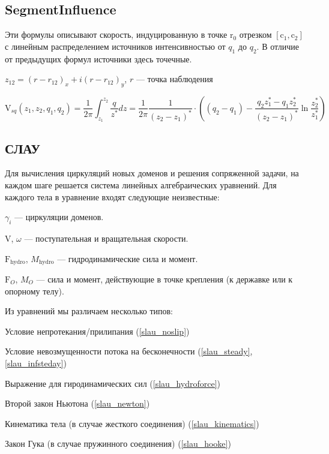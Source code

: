 \documentclass[14pt]{extreport}
\newcommand{\br}[1]{\boldsymbol{\mathrm{#1}}}
\renewcommand{\vec}[1]{\br{#1}}
\newenvironment{packed_itemize}{
\begin{itemize}
  \setlength{\itemsep}{1pt}
  \setlength{\parskip}{0pt}
  \setlength{\parsep}{0pt}
}{\end{itemize}}
\begin{document}
\subsection{SegmentInfluence}
\label{SegmentInfluence}

Эти формулы описывают скорость, индуцированную в точке $\vec r_0$ отрезком $[\vec c_1, \vec c_2]$ с линейным распределением источников интенсивностью от $q_1$ до $q_2$. В отличие от предыдущих формул источники здесь точечные.

$z_{12} = (r - r_{12})_x + i (r-r_{12})_y$, $r$ --- точка наблюдения

\begin{equation}
\label{eq_SegmentInfluence_source}
\vec V_{sq} (z_1, z_2, q_1, q_2) = \dfrac{1}{2\pi}  \int_{z_1}^{z_2}\dfrac{q}{z^*} dz = \dfrac{1}{2\pi} \dfrac{1}{(z_2-z_1)^*} \cdot \left(  (q_2-q_1) - \dfrac{q_2 z_1^* - q_1 z_2^*}{(z_2-z_1)^*}\ln \dfrac{z_2^*}{z_1^*} \right)
\end{equation}

\subsection{СЛАУ}

Для вычисления циркуляций новых доменов и решения сопряженной задачи, на каждом шаге решается система линейных алгебраических уравнений. Для каждого тела в уравнение входят следующие неизвестные:
\begin{packed_itemize}
\item $\gamma_{i}$ --- циркуляции доменов.
\item $\vec V$, $\omega$ --- поступательная и вращательная скорости.
\item $\vec F_\text{hydro}$, $M_\text{hydro}$ --- гидродинамические сила и момент.
\item $\vec F_O$, $M_O$ --- сила и момент, действующие в точке крепления (к державке или к опорному телу).
\end{packed_itemize}

Из уравнений мы различаем несколько типов:
\begin{packed_itemize}
\item Условие непротекания/прилипания (\ref{slau_noslip})
\item Условие невозмущенности потока на бесконечности (\ref{slau_steady}, \ref{slau_infsteday})
\item Выражение для гиродинамических сил (\ref{slau_hydroforce})
\item Второй закон Ньютона (\ref{slau_newton})
\item Кинематика тела (в случае жесткого соединения) (\ref{slau_kinematics})
\item Закон Гука (в случае пружинного соединения) (\ref{slau_hooke})
\end{packed_itemize}
\end{document}
